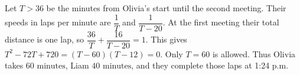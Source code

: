 Let $T>36$ be the minutes from Olivia's start until the second meeting. Their speeds in laps per minute are $\dfrac{1}{T}$ and $\dfrac{1}{T-20}$. At the first meeting their total distance is one lap, so $\dfrac{36}{T}+\dfrac{16}{T-20}=1$. This gives $T^2-72T+720=(T-60)(T-12)=0$. Only $T=60$ is allowed. Thus Olivia takes $\boxed{60\text{ minutes}}$, Liam $\boxed{40\text{ minutes}}$, and they complete those laps at 1:24 p.m.
